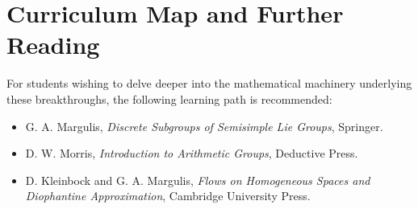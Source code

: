 \section{Curriculum Map and Further Reading}
For students wishing to delve deeper into the mathematical machinery underlying these breakthroughs, the following learning path is recommended:
\begin{itemize}
  \item G. A. Margulis, \emph{Discrete Subgroups of Semisimple Lie Groups}, Springer.
  \item D. W. Morris, \emph{Introduction to Arithmetic Groups}, Deductive Press.
  \item D. Kleinbock and G. A. Margulis, \emph{Flows on Homogeneous Spaces and Diophantine Approximation}, Cambridge University Press.
\end{itemize}

